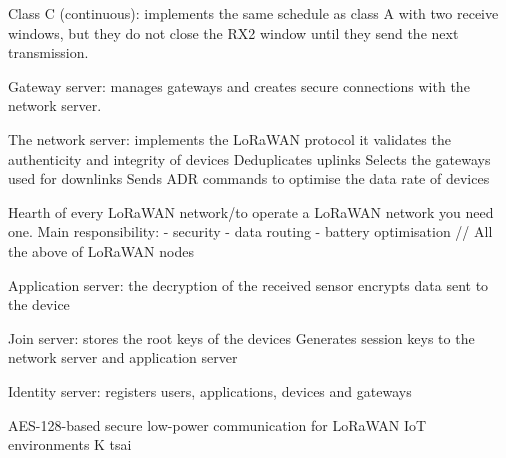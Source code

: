 Class C (continuous): implements the same schedule as class A with two receive windows, but they do not close the RX2 window until they send the next transmission.


Gateway server:
manages gateways and creates secure connections with the network server.

The network server: 
implements the \ac{LoRaWAN} protocol
it validates the authenticity and integrity of devices
Deduplicates uplinks
Selects the gateways used for downlinks
Sends ADR commands to optimise the data rate of devices

Hearth of every \ac{LoRaWAN} network/to operate a \ac{LoRaWAN} network you need one.
Main responsibility:
- security
- data routing
- battery optimisation
// All the above of \ac{LoRaWAN} nodes

Application server:
the decryption of the received sensor
encrypts data sent to the device

Join server:
stores the root keys of the devices
Generates session keys to the network server and application server

Identity server:
registers users, applications, devices and gateways

AES-128-based secure low-power communication for \ac{LoRaWAN} IoT environments K tsai

